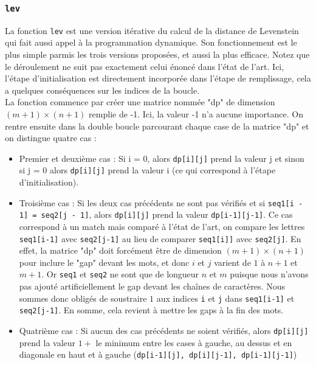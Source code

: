 \documentclass[12pt]{article}
\begin{document}
\subsubsection{\texttt{lev}}
La fonction \texttt{lev} est une version itérative du calcul de la distance de Levenstein qui fait aussi appel à la programmation dynamique. Son fonctionnement est le plus simple parmis les trois versions proposées, et aussi la plus efficace. Notez que le déroulement ne suit pas exactement celui énoncé dans l'état de l'art. Ici, l'étape d'initialisation est directement incorporée dans l'étape de remplissage, cela a quelques conséquences sur les indices de la boucle.\\

La fonction commence par créer une matrice nommée "dp" de dimension $(m+1)\times (n+1)$ remplie de -1. Ici, la valeur -1 n'a aucune importance.
On rentre ensuite dans la double boucle parcourant chaque case de la matrice "dp" et on distingue quatre cas :
\begin{itemize}
    \item Premier et deuxième cas : Si i = 0, alors \texttt{dp[i][j]} prend la valeur j et sinon si j = 0 alors \texttt{dp[i][j]} prend la valeur i (ce qui correspond à l'étape d'initialisation).
    \item Troisième cas : Si les deux cas précédents ne sont pas vérifiés et si \texttt{seq1[i - 1] = seq2[j - 1]}, alors \texttt{dp[i][j]} prend la valeur \texttt{dp[i-1][j-1]}. Ce cas correspond à un match mais comparé à l'état de l'art, on compare les lettres \texttt{seq1[i-1]} avec \texttt{seq2[j-1]} au lieu de comparer \texttt{seq1[i]]} avec \texttt{seq2[j]}. En effet, la matrice "dp" doit forcément être de dimension $(m+1)\times (n+1)$ pour inclure le "gap" devant les mots, et donc $i$ et $j$ varient de $1$ à $n+1$ et $m+1$. Or \texttt{seq1} et \texttt{seq2} ne sont que de longueur $n$ et $m$ puisque nous n'avons pas ajouté artificiellement le gap devant les chaînes de caractères. Nous sommes donc obligés de soustraire $1$ aux indices \texttt{i} et \texttt{j} dans \texttt{seq1[i-1]} et \texttt{seq2[j-1]}. En somme, cela revient à mettre les gaps à la fin des mots.
    \item Quatrième cas : Si aucun des cas précédents ne soient vérifiés, alors \texttt{dp[i][j]} prend la valeur $1 +$ le minimum entre les cases à gauche, au dessus et en diagonale en haut et à gauche (\texttt{dp[i-1][j], dp[i][j-1], dp[i-1][j-1]})
\end{itemize} 
\end{document}
